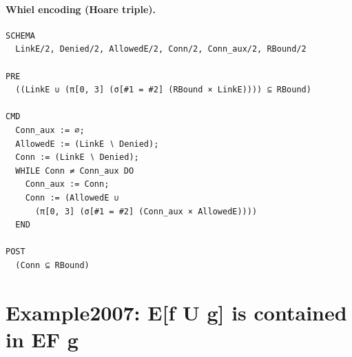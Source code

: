 \documentclass[10pt]{article}
\begin{document}
\paragraph{Whiel encoding (Hoare triple).}

\begin{Verbatim}[fontsize=\scriptsize,breaklines=true,breakanywhere=true,frame=single,framesep=1.5mm]
SCHEMA
  LinkE/2, Denied/2, AllowedE/2, Conn/2, Conn_aux/2, RBound/2

PRE
  ((LinkE ∪ (π[0, 3] (σ[#1 = #2] (RBound × LinkE)))) ⊆ RBound)

CMD
  Conn_aux := ∅;
  AllowedE := (LinkE ∖ Denied);
  Conn := (LinkE ∖ Denied);
  WHILE Conn ≠ Conn_aux DO
    Conn_aux := Conn;
    Conn := (AllowedE ∪
      (π[0, 3] (σ[#1 = #2] (Conn_aux × AllowedE))))
  END

POST
  (Conn ⊆ RBound)
\end{Verbatim}

\Needspace{0.45\textheight}

\section{Example2007: E[f U g] is contained in EF g}\label{case:Example2007}
\end{document}
